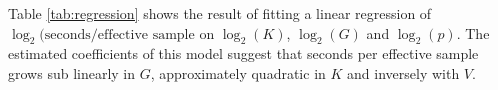 {%
% 
% 
% 


Table \ref{tab:regression} shows the result of fitting a linear regression of $\log_2(\mbox{seconds}/\mbox{effective sample}$ on $\log_2(K)$, $\log_2(G)$ and $\log_2(p)$. The estimated coefficients of this model suggest that seconds per effective sample grows sub linearly in $G$, approximately quadratic in $K$ and inversely with $V$.

}
